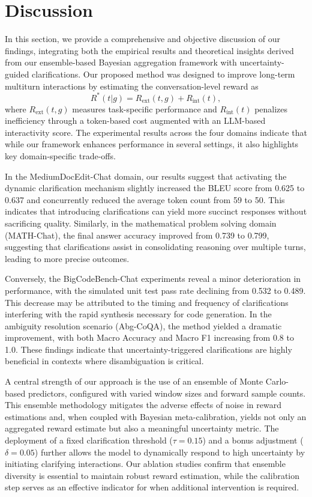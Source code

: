 \documentclass{article}
\begin{document}
\section{Discussion}
In this section, we provide a comprehensive and objective discussion of our findings, integrating both the empirical results and theoretical insights derived from our ensemble-based Bayesian aggregation framework with uncertainty-guided clarifications. Our proposed method was designed to improve long-term multiturn interactions by estimating the conversation-level reward as 
\[
R^*(t|g) = R_{\text{ext}}(t, g) + R_{\text{int}}(t),
\]
where \(R_{\text{ext}}(t, g)\) measures task-specific performance and \(R_{\text{int}}(t)\) penalizes inefficiency through a token-based cost augmented with an LLM-based interactivity score. The experimental results across the four domains indicate that while our framework enhances performance in several settings, it also highlights key domain-specific trade-offs.

In the MediumDocEdit-Chat domain, our results suggest that activating the dynamic clarification mechanism slightly increased the BLEU score from 0.625 to 0.637 and concurrently reduced the average token count from 59 to 50. This indicates that introducing clarifications can yield more succinct responses without sacrificing quality. Similarly, in the mathematical problem solving domain (MATH-Chat), the final answer accuracy improved from 0.739 to 0.799, suggesting that clarifications assist in consolidating reasoning over multiple turns, leading to more precise outcomes.

Conversely, the BigCodeBench-Chat experiments reveal a minor deterioration in performance, with the simulated unit test pass rate declining from 0.532 to 0.489. This decrease may be attributed to the timing and frequency of clarifications interfering with the rapid synthesis necessary for code generation. In the ambiguity resolution scenario (Abg-CoQA), the method yielded a dramatic improvement, with both Macro Accuracy and Macro F1 increasing from 0.8 to 1.0. These findings indicate that uncertainty-triggered clarifications are highly beneficial in contexts where disambiguation is critical.

A central strength of our approach is the use of an ensemble of Monte Carlo-based predictors, configured with varied window sizes and forward sample counts. This ensemble methodology mitigates the adverse effects of noise in reward estimations and, when coupled with Bayesian meta-calibration, yields not only an aggregated reward estimate but also a meaningful uncertainty metric. The deployment of a fixed clarification threshold (\(\tau = 0.15\)) and a bonus adjustment (\(\delta = 0.05\)) further allows the model to dynamically respond to high uncertainty by initiating clarifying interactions. Our ablation studies confirm that ensemble diversity is essential to maintain robust reward estimation, while the calibration step serves as an effective indicator for when additional intervention is required.
\end{document}
